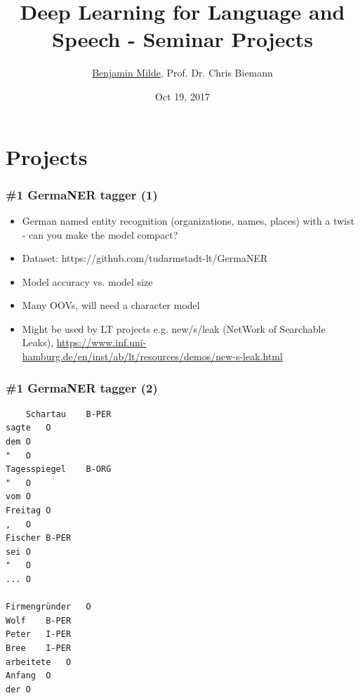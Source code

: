 \documentclass{beamer}
\title{Deep Learning for Language and Speech - Seminar Projects}
\author{\underline{Benjamin Milde}, Prof. Dr. Chris Biemann}
\date[19.10.2017]{Oct 19, 2017}
\begin{document}
\maketitle

%

\section{Projects}

\begin{frame}
\frametitle{\#1 GermaNER tagger (1)}
\begin{itemize}
	\item German named entity recognition (organizations, names, places) with a twist - can you make the model compact?
	\item Dataset: https://github.com/tudarmstadt-lt/GermaNER
	\item Model accuracy vs. model size
	\item Many OOVs, will need a character model
	\item Might be used by LT projects e.g. new/s/leak (NetWork of Searchable Leaks), \url{https://www.inf.uni-hamburg.de/en/inst/ab/lt/resources/demos/new-s-leak.html}
 \end{itemize}
\end{frame}

\begin{frame}[fragile]
\frametitle{\#1 GermaNER tagger (2)}
\begin{tiny}
  \begin{verbatim}
	Schartau	B-PER
sagte	O
dem	O
"	O
Tagesspiegel	B-ORG
"	O
vom	O
Freitag	O
,	O
Fischer	B-PER
sei	O
"	O
... O

Firmengründer	O
Wolf	B-PER
Peter	I-PER
Bree	I-PER
arbeitete	O
Anfang	O
der	O
  \end{verbatim}
  \end{tiny}
\end{frame}
\end{document}
